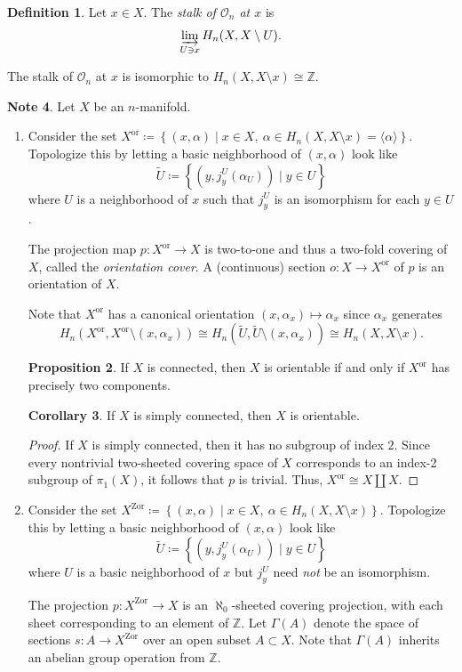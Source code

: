 \documentclass[10pt,letterpaper,cm]{nupset}
\theoremstyle{definition}
\newtheorem{definition}{Definition}[subsection]
\newtheorem{note}[definition]{Note}
\theoremstyle{theorem}
\newtheorem{prop}[definition]{Proposition}
\newtheorem{corollary}[definition]{Corollary}
\theoremstyle{remark}
\newcommand{\Z}{\mathbb Z}
\newcommand{\1}{\mathbb{1}}
\newcommand{\0}{\vec 0}
\begin{document}
\begin{definition}
Let $x\in X$. The \textit{stalk of $\mathcal{O}_n$ at $x$} is  $$\varinjlim_{U\ni x} H_n(X, X \setminus U).$$
\end{definition}


The stalk of $\mathcal{O}_n$ at $x$ is isomorphic to $H_n(X, X \setminus x) \cong \Z$.


\begin{note}
Let $X$ be an $n$-manifold.
\begin{enumerate}
\item Consider the set $X^{\mathrm{or}} \coloneqq  \left\{(x, \alpha) \mid x\in X, \ \alpha \in H_n(X, X \setminus x) =\langle \alpha \rangle \right\}$. Topologize this by letting a basic neighborhood of $(x, \alpha)$ look like $$\widetilde{U}\coloneqq  \left\{(y, j_y^U(\alpha_U)) \mid y \in U\right\}$$ where $U$ is a neighborhood of $x$ such that $j_y^U$ is an isomorphism for each $y\in U$.

The projection map $p: X^{\mathrm{or}} \to X$ is two-to-one and thus a two-fold covering of $X$, called the \textit{orientation cover}. A (continuous) section $o: X \to X^{\mathrm{or}}$ of $p$ is an orientation of $X$.

Note that $X^{\mathrm{or}}$ has a canonical orientation $(x, \alpha_x) \mapsto \alpha_x$ since $\alpha_x$ generates $$H_n(X^{\mathrm{or}}, X^{\mathrm{or}} \setminus (x, \alpha_x)) \cong H_n\left(\widetilde{U}, \widetilde{U} \setminus (x, \alpha_x)\right) \cong H_n(X, X \setminus x).$$
\begin{prop}
If $X$ is connected, then $X$ is orientable if and only if $X^{\mathrm{or}}$ has precisely two components. 
\end{prop}
\begin{corollary}
If $X$ is simply connected, then $X$ is orientable. 
\end{corollary}
\begin{proof}
If $X$ is simply connected, then it has no subgroup of index $2$. Since every nontrivial two-sheeted covering space of $X$ corresponds to an index-2 subgroup of $\pi_1(X)$, it follows that $p$ is trivial. Thus, $X^{\mathrm{or}} \cong X \coprod X$. 
\end{proof}
\item Consider the set $X^{\mathrm{Zor}} \coloneqq  \left\{(x, \alpha) \mid x\in X, \ \alpha \in H_n(X, X \setminus x) \right\}$. Topologize this by letting a basic neighborhood of $(x, \alpha)$ look like $$\widetilde{U}\coloneqq  \left\{(y, j_y^U(\alpha_U)) \mid y \in U\right\}$$ where $U$ is a basic neighborhood of $x$ but $j_y^U$ need \emph{not} be an isomorphism. 

The projection $p: X^{\mathrm{Zor}} \to X$ is an $\aleph_0$-sheeted covering projection, with each sheet corresponding to an element of $\Z$. Let  $\Gamma(A)$ denote the space of sections $s: A \to X^{\mathrm{Zor}}$ over an open subset $A\subset X$. Note that $\Gamma(A)$ inherits an abelian group operation from $\Z$. 
\end{enumerate}
\end{note}
\end{document}
